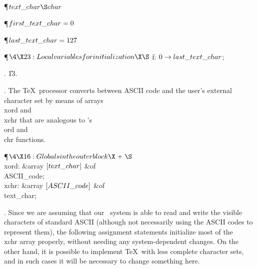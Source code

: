 \Y\P\D {}$\\{text\_char}\S\\{char}$\par
\P\D {}$\\{first\_text\_char}=0$\par
\P\D {}$\\{last\_text\_char}=127$\par
\Y\P$\4\X23:Local variables for initialization\X\S$\6
\4\|i: $0\to\\{last\_text\_char}$;\par
{}.
\U13.\fi

.
The \TeX\ processor converts between ASCII code and
the user's external character set by means of arrays \\{xord} and \\{xchr}
that are analogous to \PASCAL's \\{ord} and \\{chr} functions.

\Y\P$\4\X16:Globals in the outer block\X\mathrel{+}\S$\6
\4\\{xord}: \&{array} $[\\{text\_char}]$ \1\&{of}\5
\\{ASCII\_code};\2\6
\4\\{xchr}: \&{array} $[\\{ASCII\_code}]$ \1\&{of}\5
\\{text\_char};\2\par
\fi

.
Since we are assuming that our \PASCAL\ system is able to read and write the
visible characters of standard ASCII (although not necessarily using the
ASCII codes to represent them), the following assignment statements initialize
most of the \\{xchr} array properly, without needing any system-dependent
changes. On the other hand, it is possible to implement \TeX\ with
less complete character sets, and in such cases it will be necessary to
change something here.

